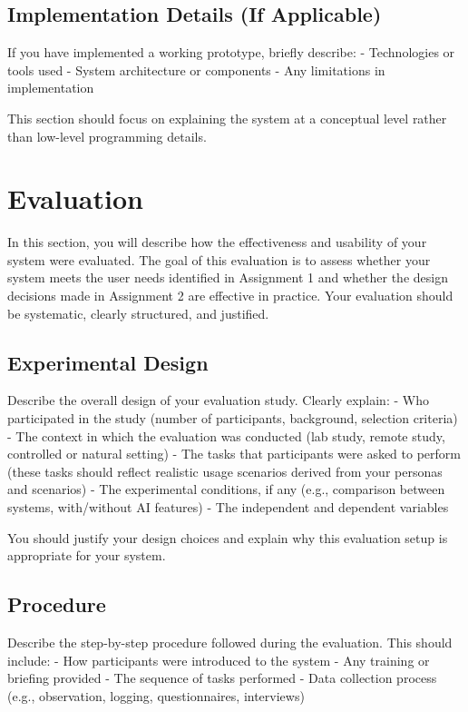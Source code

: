 \documentclass[sigconf]{acmart}
\begin{document}
\subsection{Implementation Details (If Applicable)}

If you have implemented a working prototype, briefly describe:
- Technologies or tools used
- System architecture or components
- Any limitations in implementation

This section should focus on explaining the system at a conceptual level rather than low-level programming details.
\section{Evaluation}

In this section, you will describe how the effectiveness and usability of your system were evaluated. The goal of this evaluation is to assess whether your system meets the user needs identified in Assignment 1 and whether the design decisions made in Assignment 2 are effective in practice. Your evaluation should be systematic, clearly structured, and justified.

\subsection{Experimental Design}

Describe the overall design of your evaluation study. Clearly explain:
- Who participated in the study (number of participants, background, selection criteria)
- The context in which the evaluation was conducted (lab study, remote study, controlled or natural setting)
- The tasks that participants were asked to perform (these tasks should reflect realistic usage scenarios derived from your personas and scenarios)
- The experimental conditions, if any (e.g., comparison between systems, with/without AI features)
- The independent and dependent variables

You should justify your design choices and explain why this evaluation setup is appropriate for your system.

\subsection{Procedure}

Describe the step-by-step procedure followed during the evaluation. This should include:
- How participants were introduced to the system
- Any training or briefing provided
- The sequence of tasks performed
- Data collection process (e.g., observation, logging, questionnaires, interviews)
\end{document}

